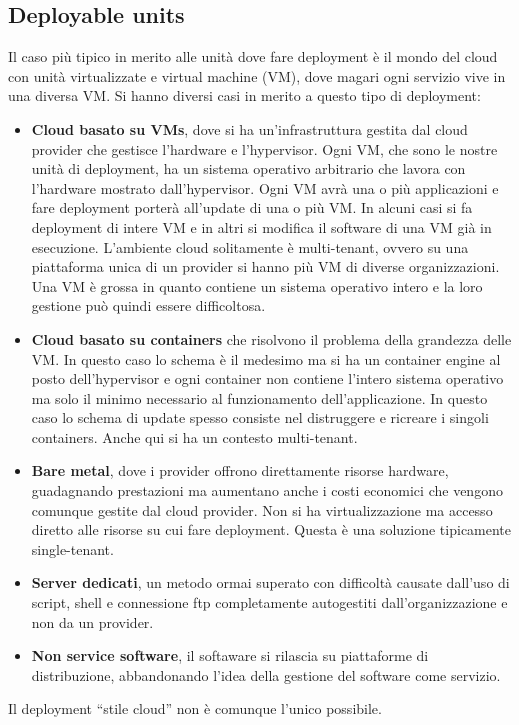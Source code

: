 \subsection{Deployable units}
Il caso più tipico in merito alle unità dove fare deployment è il mondo del cloud
con unità virtualizzate e virtual machine (VM), dove magari ogni servizio vive in
una diversa VM. Si hanno diversi casi in merito a questo tipo di deployment:
\begin{itemize}
      \item \textbf{Cloud basato su VMs}, dove si ha un'infrastruttura gestita dal
            cloud provider che gestisce l'hardware e l'hypervisor. Ogni VM, che sono le
            nostre unità di deployment, ha un sistema operativo arbitrario che lavora con
            l'hardware mostrato dall'hypervisor. Ogni VM avrà una o più applicazioni e
            fare deployment porterà all'update di una o più VM. In alcuni casi si fa
            deployment di intere VM e in altri si modifica il software di una VM già
            in esecuzione. L'ambiente cloud solitamente è multi-tenant, ovvero su una
            piattaforma unica di un provider si hanno più VM di diverse organizzazioni.
            Una VM è grossa in quanto contiene un sistema operativo intero e la loro
            gestione può quindi essere difficoltosa.
      \item \textbf{Cloud basato su containers} che risolvono il problema della
            grandezza delle VM. In questo caso lo schema è il medesimo ma si ha un container
            engine al posto dell'hypervisor e ogni container non contiene l'intero sistema
            operativo ma solo il minimo necessario al funzionamento dell'applicazione. In
            questo caso lo schema di update spesso consiste nel distruggere e ricreare
            i singoli containers. Anche qui si ha un contesto multi-tenant.
      \item \textbf{Bare metal}, dove i provider offrono direttamente risorse
            hardware, guadagnando prestazioni ma aumentano anche i costi economici
            che vengono comunque gestite dal cloud provider. Non si ha virtualizzazione
            ma accesso diretto alle risorse su cui fare deployment. Questa è una soluzione
            tipicamente single-tenant.
      \item \textbf{Server dedicati}, un metodo ormai superato con difficoltà causate
            dall'uso di script, shell e connessione ftp completamente autogestiti
            dall'organizzazione e non da un provider.
      \item \textbf{Non service software}, il softaware si rilascia su piattaforme 
            di distribuzione, abbandonando l'idea della gestione del software
            come servizio.
\end{itemize}
Il deployment “stile cloud” non è comunque l'unico possibile.
